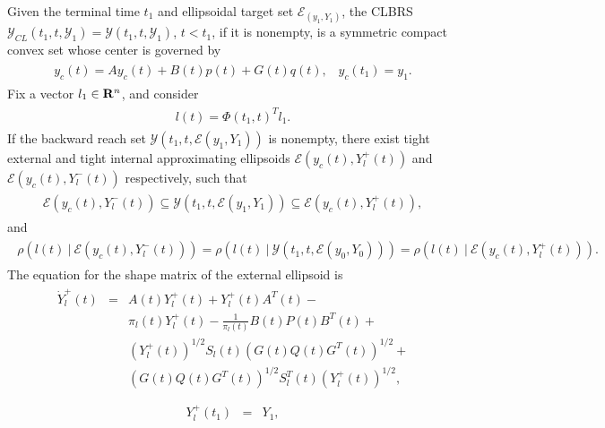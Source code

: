\documentclass[letterpaper,10pt,english]{sphinxmanual}
\begin{document}
Given the terminal time $t_1$ and ellipsoidal target set
${\mathcal E}_(y_1,Y_1)$, the CLBRS
${\mathcal Y}_{CL}(t_1, t, {\mathcal Y}_1)={\mathcal Y}(t_1, t, {\mathcal Y}_1)$,
$t<t_1$, if it is nonempty, is a symmetric compact convex set
whose center is governed by
\label{chap_reach:equation-bckcenter}\begin{gather}
\begin{split}y_c(t) = Ay_c(t) + B(t)p(t) + G(t)q(t), \;\;\; y_c(t_1) = y_1.\end{split}\label{chap_reach-bckcenter}
\end{gather}
Fix a vector $l_1\in{\bf R}^n$, and consider
\label{chap_reach:equation-bckadjoint}\begin{gather}
\begin{split}l(t) = \Phi(t_1, t)^Tl_1 .\end{split}\label{chap_reach-bckadjoint}
\end{gather}
If the backward reach set
${\mathcal Y}(t_1, t, {\mathcal E}(y_1,Y_1))$ is nonempty, there
exist tight external and tight internal approximating ellipsoids
${\mathcal E}(y_c(t), Y^+_l(t))$ and
${\mathcal E}(y_c(t), Y^-_l(t))$ respectively, such that
\label{chap_reach:equation-bckinclusion}\begin{gather}
\begin{split}{\mathcal E}(y_c(t), Y^-_l(t))\subseteq{\mathcal Y}(t_1,t,{\mathcal E}(y_1,Y_1))
\subseteq {\mathcal E}(y_c(t), Y^+_l(t)),\end{split}\label{chap_reach-bckinclusion}
\end{gather}
and
\label{chap_reach:equation-bcktightness}\begin{gather}
\begin{split}\rho(l(t) ~|~ {\mathcal E}(y_c(t), Y^-_l(t))) =
\rho(l(t) ~|~ {\mathcal Y}(t_1, t, {\mathcal E}(y_0,Y_0))) =
\rho(l(t) ~|~ {\mathcal E}(y_c(t), Y^+_l(t))) .\end{split}\label{chap_reach-bcktightness}
\end{gather}
The equation for the shape matrix of the external ellipsoid is
\label{chap_reach:equation-bckext1}\begin{gather}
\begin{split}\dot{Y}^+_l(t) & = & A(t)Y^+_l(t) + Y^+_l(t)A^T(t) -\nonumber \\
& & \pi_l(t)Y^+_l(t) - \frac{1}{\pi_l(t)}B(t)P(t)B^T(t) +\nonumber \\
& & (Y_l^{+}(t))^{1/2}S_l(t)(G(t)Q(t)G^T(t))^{1/2} +\nonumber \\
& & (G(t)Q(t)G^T(t))^{1/2}S_l^T(t)(Y_l^{+}(t))^{1/2},\\\end{split}\label{chap_reach-bckext1}
\end{gather}\label{chap_reach:equation-bckext2}\begin{gather}
\begin{split}Y^+_l(t_1) & = & Y_1,\end{split}\label{chap_reach-bckext2}
\end{gather}
\end{document}
